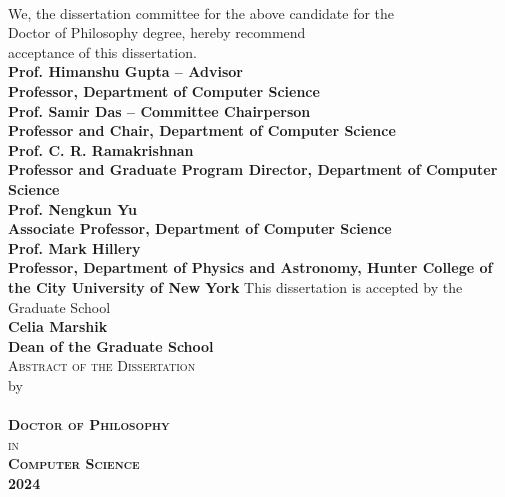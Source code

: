 \documentclass[
11pt, %
oneside, %
english, %
singlespacing, %
liststotoc, %
headsepline, %
]{MastersDoctoralThesis} %
\begin{document}
\begin{center}
  \vspace{0.5cm}
  \textbf{\authorname}  \\
  \vspace{0.5cm}
  {We}, the dissertation committee for the above candidate for the  \\
  \vspace{0.25cm}
  Doctor of Philosophy degree, hereby recommend  \\
  \vspace{0.25cm}
  acceptance of this dissertation.  \\
  \vspace{1.0cm}
  \textbf{Prof. Himanshu Gupta -- Advisor} \\
  \textbf{Professor, Department of Computer Science}   \\
  \vspace{0.75cm}
  \textbf{Prof. Samir Das  -- Committee Chairperson} \\
  \textbf{Professor and Chair, Department of Computer Science}  \\
  \vspace{0.75cm}
  \textbf{Prof. C. R. Ramakrishnan}\\
  \textbf{Professor and Graduate Program Director, Department of Computer Science}   \\
  \vspace{0.75cm}
  \textbf{Prof. Nengkun Yu} \\
  \textbf{Associate Professor, Department of Computer Science} \\
  \vspace{0.75cm}
  \textbf{Prof. Mark Hillery} \\
  \textbf{Professor, Department of Physics and Astronomy, Hunter College of the City University of New York}
  \vspace{0.75cm}
  This dissertation is accepted by the Graduate School  \\
  \vspace{0.75cm}
  \textbf{Celia Marshik}  \\
  \textbf{Dean of the Graduate School}  \\
  \vspace{0.5cm}
  \eject 
  \textsc{Abstract of the Dissertation}  \\
  \vspace{0.25cm}
  by    \\
  \vspace{0.25cm}
  \textsc{\textbf{\authorname}}  \\
  \vspace{0.25cm}
  \textsc{\textbf{Doctor of Philosophy}}  \\
  \vspace{0.25cm}
  \textsc{in}  \\
  \vspace{0.25cm}
  \textsc{\textbf{Computer Science}}   \\
  \vspace{0.25cm}
  \textsc{\textbf{2024}}    \\
\end{center}
\end{document}
